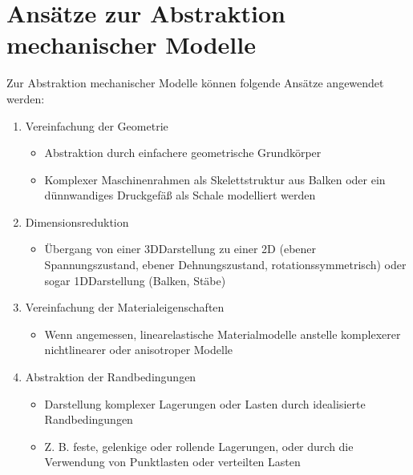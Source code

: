 \documentclass[letterpaper,10pt,german]{jupyterBook}
\begin{document}
\section{Ansätze zur Abstraktion mechanischer Modelle}
\label{\detokenize{chapters/chapter1/Einf_xfchrung_Konstruktion:ansatze-zur-abstraktion-mechanischer-modelle}}
\sphinxAtStartPar
Zur Abstraktion mechanischer Modelle können folgende Ansätze angewendet werden:
\begin{enumerate}
%
\item {} 
\sphinxAtStartPar
Vereinfachung der Geometrie
\begin{itemize}
\item {} 
\sphinxAtStartPar
Abstraktion durch einfachere geometrische Grundkörper

\item {} 
\sphinxAtStartPar
Komplexer Maschinenrahmen als Skelettstruktur aus Balken oder ein dünnwandiges Druckgefäß als Schale modelliert werden

\end{itemize}

\item {} 
\sphinxAtStartPar
Dimensionsreduktion
\begin{itemize}
\item {} 
\sphinxAtStartPar
Übergang von einer 3D\sphinxhyphen{}Darstellung zu einer 2D\sphinxhyphen{} (ebener Spannungszustand, ebener Dehnungszustand, rotationssymmetrisch) oder sogar 1D\sphinxhyphen{}Darstellung (Balken, Stäbe)

\end{itemize}

\item {} 
\sphinxAtStartPar
Vereinfachung der Materialeigenschaften
\begin{itemize}
\item {} 
\sphinxAtStartPar
Wenn angemessen, linear\sphinxhyphen{}elastische Materialmodelle anstelle komplexerer nichtlinearer oder anisotroper Modelle

\end{itemize}

\item {} 
\sphinxAtStartPar
Abstraktion der Randbedingungen
\begin{itemize}
\item {} 
\sphinxAtStartPar
Darstellung komplexer Lagerungen oder Lasten durch idealisierte Randbedingungen

\item {} 
\sphinxAtStartPar
Z. B. feste, gelenkige oder rollende Lagerungen, oder durch die Verwendung von Punktlasten oder verteilten Lasten


\end{itemize}
\end{enumerate}
\end{document}
